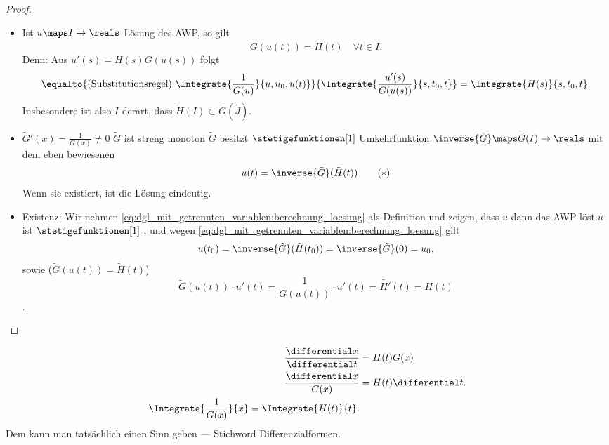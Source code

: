 \begin{proof}
  \begin{itemize}
    \item Ist \( u\maps I\to \reals \) Lösung des AWP, so gilt 
    \begin{equation*}
      \tilde{G}(u(t))=\tilde{H}(t) \quad \forall t\in I.
    \end{equation*}
    Denn: Aus \( u'(s)=H(s) G(u(s)) \) folgt
    \begin{equation*}
      \equalto{(\text{Substitutionsregel})\ \Integrate{\frac{1}{G(u)}}{u,u_0,u(t)}}{\Integrate{\frac{u'(s)}{G(u(s))}}{s,t_0,t}}=\Integrate{H(s)}{s,t_0,t}.
    \end{equation*}
    Insbesondere ist also \( I \) derart, dass \( \tilde{H}(I)\subset \tilde{G}(\tilde{J}) \).
    \item \( \tilde{G}'(x)=\frac{1}{G(x)}\neq 0 \) \timplies \( \tilde{G}  \) ist streng monoton \timplies \( \tilde{G} \) besitzt \( \stetigefunktionen[1] \) Umkehrfunktion \( \inverse{\tilde{G}}\maps \tilde{G}(I)\to \reals \) \timplies mit dem eben bewiesenen
    \begin{equation*}
      u(t)=\inverse{\tilde{G}}(\tilde{H}(t))\tag{\( * \)}\label{eq:dgl_mit_getrennten_variablen:berechnung_loesung}
    \end{equation*}
    \timplies Wenn sie existiert, ist die Lösung eindeutig.
    \item Existenz: Wir nehmen \eqref{eq:dgl_mit_getrennten_variablen:berechnung_loesung} als Definition und zeigen, dass \( u \) dann das AWP löst.\( u \) ist \( \stetigefunktionen[1]\) \checkmark, und wegen \eqref{eq:dgl_mit_getrennten_variablen:berechnung_loesung} gilt
    \begin{equation*}
      u(t_0)=\inverse{\tilde{G}}(\tilde{H}(t_0))=\inverse{\tilde{G}}(0)=u_0,
    \end{equation*}
    sowie (\( \tilde{G}(u(t))=\tilde{H}(t) \))
    \begin{equation*}
      \tilde{G}(u(t))\cdot u'(t)=\frac{1}{G(u(t))}\cdot u'(t)=\tilde{H'}(t)=H(t)
    \end{equation*}
    \timplies \Beh.
  \end{itemize}
\end{proof}
\begin{merkregel}
  \begin{align*}
    \frac{\differential x}{\differential t}&=H(t) G(x)\\
    \frac{\differential x}{G(x)}&=H(t)\differential t.\\
    \Integrate{\frac{1}{G(x)}}{x}=\Integrate{H(t)}{t}.
  \end{align*}
  Dem kann man tatsächlich einen Sinn geben --- Stichword Differenzialformen.
\end{merkregel}
